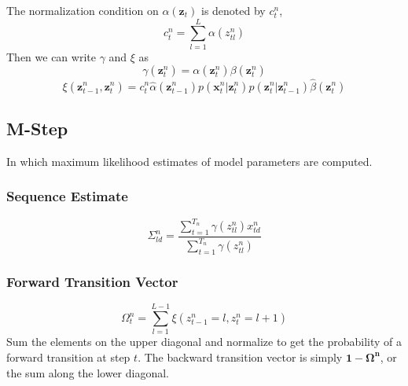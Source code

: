 \documentclass[reqno]{amsart}
\numberwithin{equation}{section}
\begin{document}
The normalization condition on $\alpha(\mathbf{z}_t)$ is denoted by $c_t^n$, 
\begin{equation}
c_t^n = \displaystyle\sum_{l=1}^{L} \alpha(z_{tl}^n)
\end{equation}
Then we can write $\gamma$ and $\xi$ as
\begin{equation}
\gamma(\mathbf{z}_t^n) = \alpha(\mathbf{z}_t^n)\beta(\mathbf{z}_t^n)
\end{equation}
\begin{equation}
\xi(\mathbf{z}_{t-1}^n,\mathbf{z}_{t}^n) = c_t^n \hat{\alpha}(\mathbf{z}_{t-1}^n)p(\mathbf{x}_t^n|\mathbf{z}_t^n)p(\mathbf{z}_t^n|\mathbf{z}_{t-1}^n)\hat{\beta}(\mathbf{z}_t^n)
\end{equation}

\subsection{M-Step}
In which maximum likelihood estimates of model parameters are computed.

\subsubsection{Sequence Estimate}
\begin{equation}
\Sigma_{ld}^{n} = \frac{\displaystyle\sum_{t=1}^{T_n} \gamma(z_{tl}^n)x_{td}^n}{\displaystyle\sum_{t=1}^{T_n}\gamma(z_{tl}^n)}
\end{equation}

\subsubsection{Forward Transition Vector}
\begin{equation}
\Omega_t^n = \displaystyle\sum_{l=1}^{L-1} \xi(z_{t-1}^n=l,z_t^n=l+1)
\end{equation}
Sum the elements on the upper diagonal and normalize to get the probability of a forward transition at step $t$. The backward transition vector is simply $\mathbf{1}-\mathbf{\Omega^n}$, or the sum along the lower diagonal.

\end{document}
